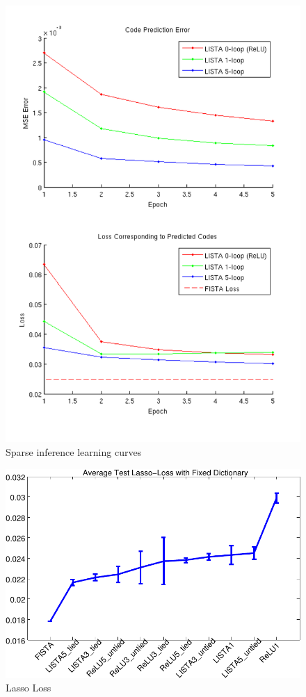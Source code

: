 \begin{figure}
\centering
\includegraphics[scale=0.75]{./figures/LISTA/code_pred.pdf}
\caption{Sparse inference learning curves} 
\label{fig:learning_curves} 
\end{figure}  

\begin{figure}
\centering
\includegraphics[scale=0.75]{./figures/LISTA/fixed_decoder_loss.pdf}
\caption{Lasso Loss} 
\label{fig:lasso_loss} 
\end{figure}  


